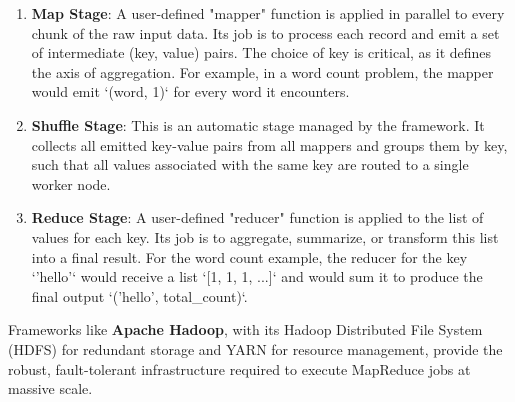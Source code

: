 \begin{enumerate}
    \item \textbf{Map Stage}: A user-defined "mapper" function is applied in parallel to every chunk of the raw input data. Its job is to process each record and emit a set of intermediate (key, value) pairs. The choice of key is critical, as it defines the axis of aggregation. For example, in a word count problem, the mapper would emit `(word, 1)` for every word it encounters.
    \item \textbf{Shuffle Stage}: This is an automatic stage managed by the framework. It collects all emitted key-value pairs from all mappers and groups them by key, such that all values associated with the same key are routed to a single worker node.
    \item \textbf{Reduce Stage}: A user-defined "reducer" function is applied to the list of values for each key. Its job is to aggregate, summarize, or transform this list into a final result. For the word count example, the reducer for the key `'hello'` would receive a list `[1, 1, 1, ...]` and would sum it to produce the final output `('hello', total_count)`.
\end{enumerate}
Frameworks like \textbf{Apache Hadoop}, with its Hadoop Distributed File System (HDFS) for redundant storage and YARN for resource management, provide the robust, fault-tolerant infrastructure required to execute MapReduce jobs at massive scale.